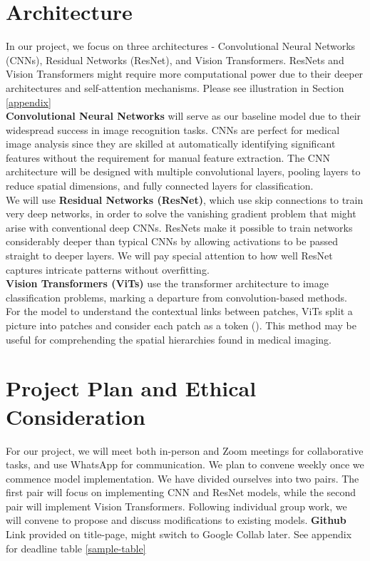 \documentclass{article}
\begin{document}
\section{Architecture}
In our project, we focus on three architectures - Convolutional Neural Networks (CNNs), Residual Networks (ResNet), and Vision Transformers. ResNets and Vision Transformers might require more computational power due to their deeper architectures and self-attention mechanisms. Please see illustration in  Section \ref{appendix} \\
 \textbf{Convolutional Neural Networks} will serve as our baseline model due to their widespread success in image recognition tasks. CNNs are perfect for medical image analysis since they are skilled at automatically identifying significant features without the requirement for manual feature extraction. The CNN architecture will be designed with multiple convolutional layers, pooling layers to reduce spatial dimensions, and fully connected layers for classification. \\
We will use \textbf{Residual Networks (ResNet)}, which use skip connections to train very deep networks, in order to solve the vanishing gradient problem that might arise with conventional deep CNNs. ResNets make it possible to train networks considerably deeper than typical CNNs by allowing activations to be passed straight to deeper layers. We will pay special attention to how well ResNet captures intricate patterns without overfitting. \\
\textbf{Vision Transformers (ViTs)} use the transformer architecture to image classification problems, marking a departure from convolution-based methods. For the model to understand the contextual links between patches, ViTs split a picture into patches and consider each patch as a token (\citet{MANZARI2023106791}). This method may be useful for comprehending the spatial hierarchies found in medical imaging. 
\section{Project Plan and Ethical Consideration}

For our project, we will meet both in-person and Zoom meetings for collaborative tasks, and use WhatsApp for communication. We plan to convene weekly once we commence model implementation. We have divided ourselves into two pairs. The first pair will focus on implementing CNN and ResNet models, while the second pair will implement Vision Transformers. Following individual group work, we will convene to propose and discuss modifications to existing models. \textbf{Github} Link provided on title-page, might switch to Google Collab later. See appendix for deadline table \ref{sample-table}
\end{document}
